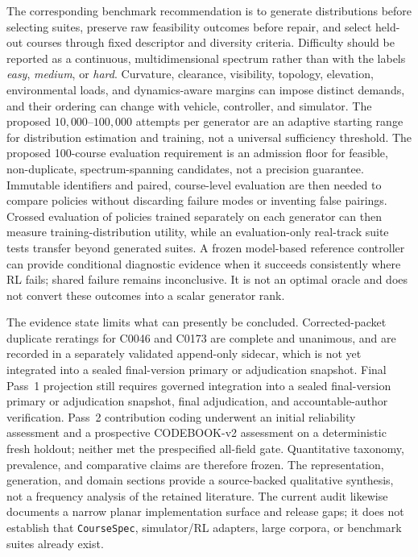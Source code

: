 The corresponding benchmark recommendation is to generate distributions before
selecting suites, preserve raw feasibility outcomes before repair, and select held-out
courses through fixed descriptor and diversity criteria. Difficulty should be reported
as a continuous, multidimensional spectrum rather than with the labels \emph{easy},
\emph{medium}, or \emph{hard}. Curvature, clearance, visibility, topology, elevation,
environmental loads, and dynamics-aware margins can impose distinct demands, and their
ordering can change with vehicle, controller, and simulator. The proposed
$10{,}000$--$100{,}000$ attempts per generator are an adaptive starting range for
distribution estimation and training, not a universal sufficiency threshold. The
proposed 100-course evaluation requirement is an admission floor for feasible,
non-duplicate, spectrum-spanning candidates, not a precision guarantee. Immutable
identifiers and paired, course-level evaluation are then needed to compare policies
without discarding failure modes or inventing false pairings.
Crossed evaluation of policies trained separately on each generator can then measure
training-distribution utility, while an evaluation-only real-track suite tests transfer
beyond generated suites. A frozen model-based reference controller can provide
conditional diagnostic evidence when it succeeds consistently where RL fails; shared
failure remains inconclusive. It is not an optimal oracle and does not convert these
outcomes into a scalar generator rank.

The evidence state limits what can presently be concluded. Corrected-packet duplicate
reratings for C0046 and C0173 are complete and unanimous, and are recorded in a
separately validated append-only sidecar, which is not yet integrated into a sealed
final-version primary or adjudication snapshot. Final Pass~1 projection still requires
governed integration into a sealed final-version primary or adjudication snapshot, final
adjudication, and accountable-author verification. Pass~2 contribution coding
underwent an initial
reliability assessment and a prospective CODEBOOK-v2 assessment on a deterministic
fresh holdout; neither met the prespecified all-field gate. Quantitative taxonomy,
prevalence, and comparative claims are therefore frozen. The representation,
generation, and domain sections provide a source-backed qualitative synthesis, not a
frequency analysis of the retained literature. The current \TrackGen{} audit likewise
documents a narrow planar implementation surface and release gaps; it does not
establish that \texttt{CourseSpec}, simulator/RL adapters, large corpora, or benchmark
suites already exist.

